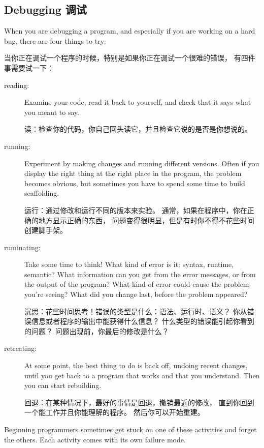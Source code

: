\documentclass[10pt]{book}
\begin{document}
\begin{CJK}{UTF8}{gbsn}
\section{Debugging 调试}

When you are debugging a program, and especially if you are
working on a hard bug, there are four things to try:

当你正在调试一个程序的时候，特别是如果你正在调试一个很难的错误，
有四件事需要试一下：

\begin{description}

\item[reading:] Examine your code, read it back to yourself, and
check that it says what you meant to say.

读：检查你的代码，你自己回头读它，并且检查它说的是否是你想说的。

\item[running:] Experiment by making changes and running different
versions.  Often if you display the right thing at the right place
in the program, the problem becomes obvious, but sometimes you have to
spend some time to build scaffolding.

运行：通过修改和运行不同的版本来实验。
通常，如果在程序中，你在正确的地方显示正确的东西，
问题变得很明显，但是有时你不得不花些时间创建脚手架。

\item[ruminating:] Take some time to think!  What kind of error
is it: syntax, runtime, semantic?  What information can you get from
the error messages, or from the output of the program?  What kind of
error could cause the problem you're seeing?  What did you change
last, before the problem appeared?

沉思：花些时间思考！错误的类型是什么：语法、运行时、语义？
你从错误信息或者程序的输出中能获得什么信息？
什么类型的错误能引起你看到的问题？
问题出现前，你最后的修改是什么？

\item[retreating:] At some point, the best thing to do is back
off, undoing recent changes, until you get back to a program that
works and that you understand.  Then you can start rebuilding.

回退：在某种情况下，最好的事情是回退，撤销最近的修改，
直到你回到一个能工作并且你能理解的程序。
然后你可以开始重建。

\end{description}

Beginning programmers sometimes get stuck on one of these activities
and forget the others.  Each activity comes with its own failure
mode.


\end{CJK}
\end{document}

